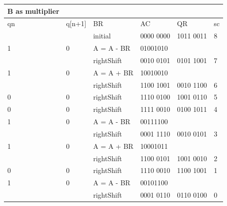 \documentclass[12pt, a4paper]{article}
\begin{document}
\begin{table}[h!]
\begin{tabular}{|l|l|l|l|l|l|}
B as multiplier\\
\hline
qn & q[n+1] & BR & AC & QR & sc\\
\hline
& & initial & 0000 0000  & 1011 0011  & 8\\
\hline
1 & 0 & A = A - BR &01001010 & & \\
\hline
& &  rightShift & 0010 0101  & 0101 1001  & 7\\
\hline
1 & 0 & A = A + BR & 10010010 & & \\
\hline
& &  rightShift & 1100 1001  & 0010 1100  & 6\\
\hline
0 & 0 &  rightShift & 1110 0100  & 1001 0110  & 5\\
\hline
0 & 0 &  rightShift & 1111 0010  & 0100 1011  & 4\\
\hline
1 & 0 & A = A - BR &00111100 & & \\
\hline
& &  rightShift & 0001 1110  & 0010 0101  & 3\\
\hline
1 & 0 & A = A + BR & 10001011 & & \\
\hline
& &  rightShift & 1100 0101  & 1001 0010  & 2\\
\hline
0 & 0 &  rightShift & 1110 0010  & 1100 1001  & 1\\
\hline
1 & 0 & A = A - BR &00101100 & & \\
\hline
& &  rightShift & 0001 0110  & 0110 0100  & 0\\
\hline
\end{tabular}
\end{table}
\end{document}
